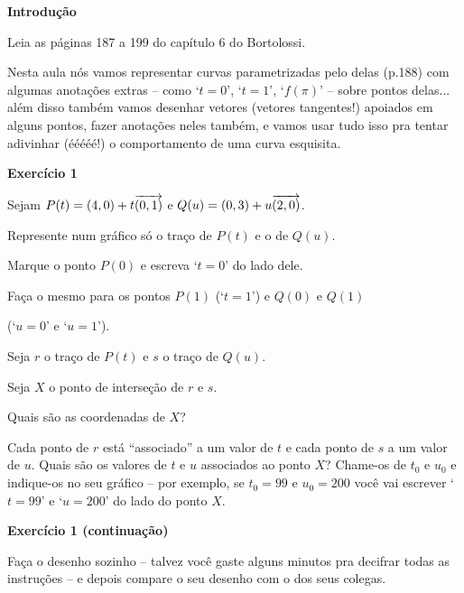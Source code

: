 \documentclass[oneside,12pt]{article}
\begin{document}
{\bf Introdução}

Leia as páginas 187 a 199 do capítulo 6 do Bortolossi.

Nesta aula nós vamos representar curvas parametrizadas pelo
 delas (p.188) com algumas anotações extras -- como
`$t=0$', `$t=1$', `$f(π)$' -- sobre pontos delas... além disso também
vamos desenhar vetores (vetores tangentes!) apoiados em alguns pontos,
fazer anotações neles também, e vamos usar tudo isso pra tentar
adivinhar (ééééé!) o comportamento de uma curva esquisita.


\newpage


{\bf Exercício 1}

Sejam $P(t) = (4,0) + t{\overrightarrow{(0,1)}}$ e $Q(u) = (0,3) + u{\overrightarrow{(2,0)}}$.

Represente num gráfico só o traço de $P(t)$ e o de $Q(u)$.

Marque o ponto $P(0)$ e escreva `$t=0$' do lado dele.

Faça o mesmo para os pontos $P(1)$ (`$t=1$') e $Q(0)$ e $Q(1)$

(`$u=0$' e `$u=1$'). 

\msk

Seja $r$ o traço de $P(t)$ e $s$ o traço de $Q(u)$.

Seja $X$ o ponto de interseção de $r$ e $s$.

Quais são as coordenadas de $X$?

\msk

Cada ponto de $r$ está ``associado'' a um valor de $t$ e cada ponto de
$s$ a um valor de $u$. Quais são os valores de $t$ e $u$ associados ao
ponto $X$? Chame-os de $t_0$ e $u_0$ e indique-os no seu gráfico --
por exemplo, se $t_0=99$ e $u_0=200$ você vai escrever `$t=99$' e
`$u=200$' do lado do ponto $X$.

\newpage

{\bf Exercício 1 (continuação)}

Faça o desenho sozinho -- talvez você gaste alguns minutos pra
decifrar todas as instruções -- e depois compare o seu desenho com o
dos seus colegas.


\newpage

\end{document}

